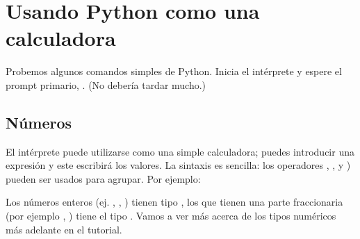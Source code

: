 \documentclass[a4,10pt,spanish]{sphinxmanual}
\begin{document}
\section{Usando Python como una calculadora}
\label{\detokenize{tutorial/introduction:using-python-as-a-calculator}}\label{\detokenize{tutorial/introduction:tut-calculator}}
\sphinxAtStartPar
Probemos algunos comandos simples de Python. Inicia el intérprete y espere el prompt primario, \sphinxcode{\sphinxupquote{>>>}}. (No debería tardar mucho.)


\subsection{Números}
\label{\detokenize{tutorial/introduction:numbers}}\label{\detokenize{tutorial/introduction:tut-numbers}}
\sphinxAtStartPar
El intérprete puede utilizarse como una simple calculadora; puedes introducir una expresión y este escribirá los valores. La sintaxis es sencilla: los operadores \sphinxcode{\sphinxupquote{+}}, \sphinxcode{\sphinxupquote{\sphinxhyphen{}}}, \sphinxcode{\sphinxupquote{*}} y ) pueden ser usados para agrupar. Por ejemplo:

\begin{sphinxVerbatim}[commandchars=\\\{\}]
  
  
    
    
\end{sphinxVerbatim}

\sphinxAtStartPar
Los números enteros (ej. , , ) tienen tipo , los que tienen una parte fraccionaria (por ejemplo , ) tiene el tipo . Vamos a ver más acerca de los tipos numéricos más adelante en el tutorial.
\end{document}
